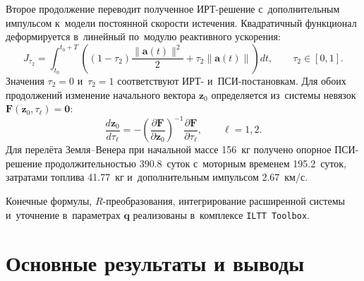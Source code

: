 Второе продолжение переводит полученное ИРТ-решение с~дополнительным импульсом к~модели постоянной скорости истечения. Квадратичный функционал деформируется в~линейный по~модулю реактивного ускорения:
\begin{equation}
    J_{\tau_2}=\int_{t_0}^{t_0+T}
    \left((1-\tau_2)\frac{\lVert\mathbf a(t)\rVert^2}{2}
    +\tau_2\lVert\mathbf a(t)\rVert\right)dt,
    \qquad \tau_2\in[0,1].
    \label{eq:syn-psi-continuation}
\end{equation}
Значения $\tau_2=0$ и~$\tau_2=1$ соответствуют ИРТ- и~ПСИ-постановкам. Для обоих продолжений изменение начального вектора $\mathbf z_0$ определяется из~системы невязок $\mathbf F(\mathbf z_0,\tau_\ell)=\mathbf0$:
\begin{equation}
    \frac{d\mathbf z_0}{d\tau_\ell}=
    -\left(\frac{\partial\mathbf F}{\partial\mathbf z_0}\right)^{-1}
    \frac{\partial\mathbf F}{\partial\tau_\ell},
    \qquad \ell=1,2.
    \label{eq:syn-two-continuations}
\end{equation}
Для перелёта Земля--Венера при начальной массе 156~кг получено опорное ПСИ-решение продолжительностью 390.8~суток с~моторным временем 195.2~суток, затратами топлива 41.77~кг и~дополнительным импульсом 2.67~км/с.

Конечные формулы, $R$-преобразования, интегрирование расширенной системы и~уточнение в~параметрах $\mathbf q$ реализованы в~комплексе \texttt{ILTT Toolbox}.

\FloatBarrier
{}
\section*{Основные результаты и выводы}

